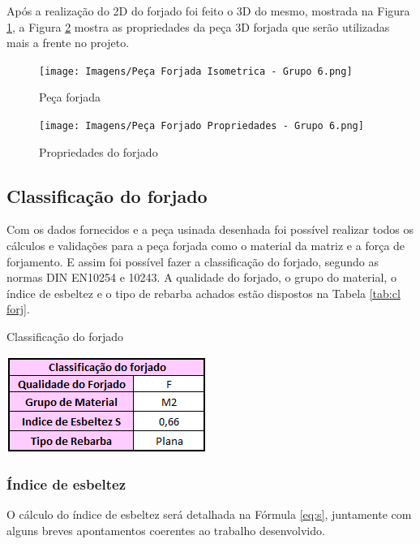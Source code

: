 \documentclass[deposito, acronym, symbols]{fei}
\begin{document}
Após a realização do 2D do forjado foi feito o 3D do mesmo, mostrada na Figura \ref{fig:peçaforjadaiso}, a Figura \ref{fig:peçaforjadaprop} mostra as propriedades da peça 3D forjada que serão utilizadas mais a frente no projeto.

\begin{figure}[!htp]
    \centering
    \caption{Peça forjada}
    \texttt{[image: Imagens/Peça Forjada Isometrica - Grupo 6.png]}
    \label{fig:peçaforjadaiso}
\end{figure}


\begin{figure}[!htp]
    \centering
    \caption{Propriedades do forjado}
    \texttt{[image: Imagens/Peça Forjado Propriedades - Grupo 6.png]}
    \label{fig:peçaforjadaprop}
\end{figure}


\newpage
\subsection{Classificação do forjado}

Com os dados fornecidos e a peça usinada desenhada foi possível realizar todos os cálculos e validações para a peça forjada como o material da matriz e a força de forjamento. E assim foi possível fazer a classificação do forjado, segundo as normas DIN EN10254 e 10243. A qualidade do forjado, o grupo do material, o índice de esbeltez e o tipo de rebarba achados estão dispostos na Tabela \ref{tab:cl forj}.

\begin{table}[!htb]
 \centering
    \caption{Classificação do forjado}
    \includegraphics[width=0.4\linewidth]{Imagens/classificação .png}
    \label{tab:cl forj}
\end{table}

\subsubsection{Índice de esbeltez}

O cálculo do índice de esbeltez será detalhada na Fórmula \ref{eq:s}, juntamente com alguns breves apontamentos coerentes ao trabalho desenvolvido.
\end{document}
